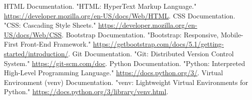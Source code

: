 \documentclass[10pt]{article}
\begin{document}
\begin{thebibliography}{99}
     HTML Documentation. "HTML: HyperText Markup Language." \url{https://developer.mozilla.org/en-US/docs/Web/HTML}.
     CSS Documentation. "CSS: Cascading Style Sheets." \url{https://developer.mozilla.org/en-US/docs/Web/CSS}.
     Bootstrap Documentation. "Bootstrap: Responsive, Mobile-First Front-End Framework." \url{https://getbootstrap.com/docs/5.1/getting-started/introduction/}.
     Git Documentation. "Git: Distributed Version Control System." \url{https://git-scm.com/doc}.
     Python Documentation. "Python: Interpreted High-Level Programming Language." \url{https://docs.python.org/3/}.
     Virtual Environment (venv) Documentation. "venv: Lightweight Virtual Environments for Python." \url{https://docs.python.org/3/library/venv.html}.
\end{thebibliography}

\appendix
\end{document}
